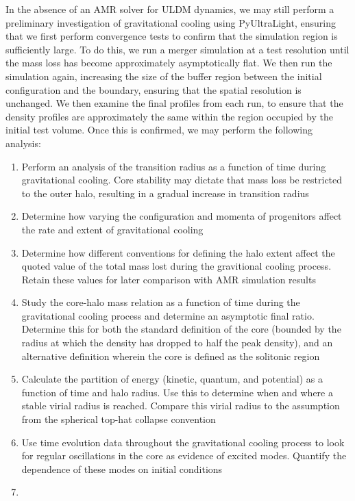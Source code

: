 In the absence of an AMR solver for ULDM dynamics, we may still perform a preliminary investigation of gravitational cooling using PyUltraLight, ensuring that we first perform convergence tests to confirm that the simulation region is sufficiently large. To do this, we run a merger simulation at a test resolution until the mass loss has become approximately asymptotically flat. We then run the simulation again, increasing the size of the buffer region between the initial configuration and the boundary, ensuring that the spatial resolution is unchanged. We then examine the final profiles from each run, to ensure that the density profiles are approximately the same within the region occupied by the initial test volume. Once this is confirmed, we may perform the following analysis:
\begin{enumerate}
    \item Perform an analysis of the transition radius as a function of time during gravitational cooling. Core stability may dictate that mass loss be restricted to the outer halo, resulting in a gradual increase in transition radius
    \item Determine how varying the configuration and momenta of progenitors affect the rate and extent of gravitational cooling
    \item Determine how different conventions for defining the halo extent affect the quoted value of the total mass lost during the gravitional cooling process. Retain these values for later comparison with AMR simulation results
    \item Study the core-halo mass relation as a function of time during the gravitational cooling process and determine an asymptotic final ratio. Determine this for both the standard definition of the core (bounded by the radius at which the density has dropped to half the peak density), and an alternative definition wherein the core is defined as the solitonic region
    \item Calculate the partition of energy (kinetic, quantum, and potential) as a function of time and halo radius. Use this to determine when and where a stable virial radius is reached. Compare this virial radius to the assumption from the spherical top-hat collapse convention
    \item Use time evolution data throughout the gravitational cooling process to look for regular oscillations in the core as evidence of excited modes. Quantify the dependence of these modes on initial conditions 
    \item {}
\end{enumerate}



